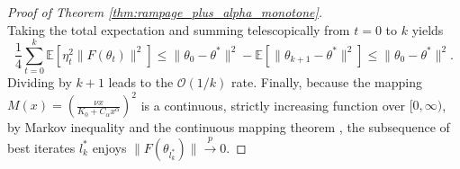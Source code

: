 \documentclass[letter,11pt]{article}
\begin{document}
\begin{proof}[Proof of Theorem \ref{thm:rampage_plus_alpha_monotone}]
\begin{equation}
\end{equation}
Taking the total expectation and summing telescopically from $t=0$ to $k$ yields
\begin{equation}
\frac{1}{4} \sum_{t=0}^k \mathbb{E}\left[\eta_t^2 \|F(\theta_t)\|^2\right] \le \|\theta_0 - \theta^*\|^2 - \mathbb{E}\left[\|\theta_{k+1} - \theta^*\|^2\right] \le \|\theta_0 - \theta^*\|^2.
\end{equation}
Dividing by $k+1$ leads to the $\mathcal{O}(1/k)$ rate. Finally, because the mapping $M(x) = \left( \frac{\nu x}{K_0 + C_\alpha x^\alpha} \right)^2$ is a continuous, strictly increasing function over $[0, \infty)$, by Markov inequality and the continuous mapping theorem \cite{mann1943stochastic}, the subsequence of best iterates $l^\ast_k$ enjoys $\|F(\theta_{l^\ast_k})\| \xrightarrow{p} 0$.
\end{proof}
\end{document}
